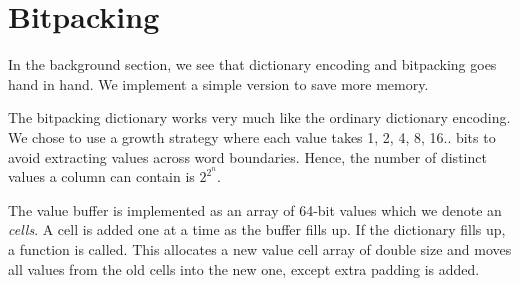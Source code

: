\section{Bitpacking}
\label{sec:Bitpacking}
In the background section, we see that dictionary encoding and bitpacking goes hand in hand. We implement a simple version to save more memory. 

The bitpacking dictionary works very much like the ordinary dictionary encoding. We chose to use a growth strategy where each value takes 1, 2, 4, 8, 16.. bits to avoid extracting values across word boundaries. Hence, the number of distinct values a column can contain is $2^{2^n}$.

The value buffer is implemented as an array of 64-bit values which we denote an \textit{cells}. A cell is added one at a time as the buffer fills up. If the dictionary fills up, a  function is called. This allocates a new value cell array of double size and moves all values from the old cells into the new one, except extra padding is added.

